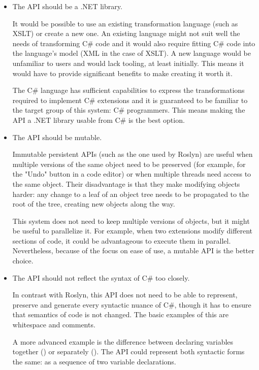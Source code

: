 \begin{itemize}

\item The \ac{API} should be a .NET library.

It would be possible to use an existing transformation language (such as \ac{XSLT}) or create a new one.
An existing language might not suit well the needs of transforming C\# code and it would also require fitting C\# code into the language's model (\ac{XML} in the case of \ac{XSLT}).
A new language would be unfamiliar to users and would lack tooling, at least initially. This means it would have to provide significant benefits to make creating it worth it.

The C\# language has sufficient capabilities to express the transformations required to implement C\# extensions and it is guaranteed to be familiar to the target group of this system: C\# programmers. This means making the \ac{API} a .NET library usable from C\# is the best option.
	
\item The \ac{API} should be mutable.

Immutable persistent \acp{API} (such as the one used by Roslyn) are useful when multiple versions of the same object need to be preserved (for example, for the "Undo" button in a code editor) or when multiple threads need access to the same object. Their disadvantage is that they make modifying objects harder: any change to a leaf of an object tree needs to be propagated to the root of the tree, creating new objects along the way.

This system does not need to keep multiple versions of objects, but it might be useful to parallelize it. For example, when two extensions modify different sections of code, it could be advantageous to execute them in parallel. Nevertheless, because of the focus on ease of use, a mutable \ac{API} is the better choice.

\item The \ac{API} should not reflect the syntax of C\# too closely.

In contrast with Roslyn, this \ac{API} does not need to be able to represent, preserve and generate every syntactic nuance of C\#, though it has to ensure that semantics of code is not changed. The basic examples of this are whitespace and comments.

A more advanced example is the difference between declaring variables together () or separately (). The \ac{API} could represent both syntactic forms the same: as a sequence of two variable declarations. 


\end{itemize}

